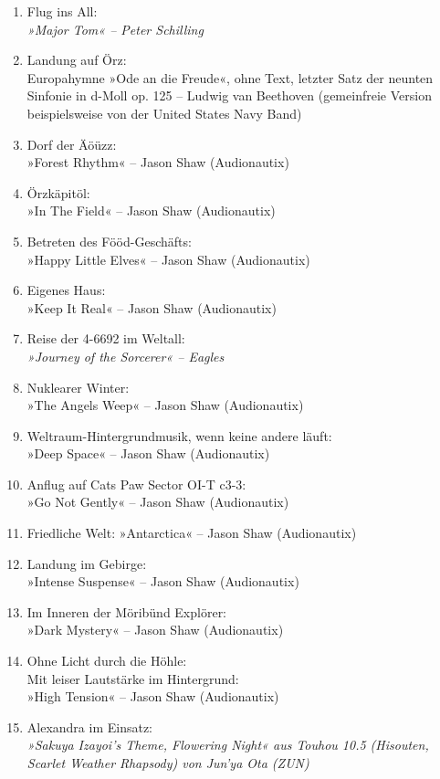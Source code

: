 \begin{enumerate}
    \item Flug ins All:\\ \textit{»Major Tom« – Peter Schilling}
    \item Landung auf Örz:\\ Europahymne »Ode an die Freude«, ohne Text, letzter Satz der neunten Sinfonie in d-Moll op. 125 – Ludwig van Beethoven (gemeinfreie Version beispielsweise von der United States Navy Band)
    \item Dorf der Äöüzz:\\ »Forest Rhythm« – Jason Shaw (Audionautix)
    \item Örzkäpitöl:\\ »In The Field« – Jason Shaw (Audionautix)
    \item Betreten des Fööd-Geschäfts:\\ »Happy Little Elves« – Jason Shaw (Audionautix)
    \item Eigenes Haus:\\ »Keep It Real« – Jason Shaw (Audionautix)
    \item Reise der 4-6692 im Weltall:\\ \textit{»Journey of the Sorcerer« – Eagles}
    \item Nuklearer Winter:\\ »The Angels Weep« – Jason Shaw (Audionautix)    
    \item Weltraum-Hintergrundmusik, wenn keine andere läuft:\\ »Deep Space« – Jason Shaw (Audionautix)
    \item Anflug auf Cats Paw Sector OI-T c3-3:\\ »Go Not Gently« – Jason Shaw (Audionautix)
    \item Friedliche Welt: »Antarctica« – Jason Shaw (Audionautix)
    \item Landung im Gebirge:\\ »Intense Suspense« – Jason Shaw (Audionautix)
    \item Im Inneren der Möribünd Explörer:\\ »Dark Mystery« – Jason Shaw (Audionautix) 
    \item Ohne Licht durch die Höhle:\\ Mit leiser Lautstärke im Hintergrund:\\ »High Tension« – Jason Shaw (Audionautix)
    \item Alexandra im Einsatz:\\  \textit{»Sakuya Izayoi's Theme, Flowering Night« aus Touhou 10.5 (Hisouten, Scarlet Weather Rhapsody) von Jun'ya Ota (ZUN)}

\end{enumerate}
